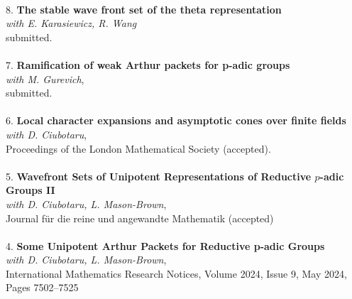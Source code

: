 \documentclass{article}
\begin{document}
\underline{\hspace{1.1in}} 
\\
8. \textbf{The stable wave front set of the theta representation} \\%
\textit{with E. Karasiewicz, R. Wang} \\
submitted. \\
\\
7. \textbf{Ramification of weak Arthur packets for p-adic groups} \\%
\textit{with M. Gurevich}, \\
submitted. \\
\\
6. \textbf{Local character expansions and asymptotic cones over finite fields} \\%
\textit{with D. Ciubotaru}, \\
Proceedings of the London Mathematical Society (accepted). \\
\\
5. \textbf{Wavefront Sets of Unipotent Representations of Reductive $p$-adic Groups II} \\%
\textit{with D. Ciubotaru, L. Mason-Brown}, \\
Journal für die reine und angewandte Mathematik (accepted) \\
\\
4. \textbf{Some Unipotent Arthur Packets for Reductive p-adic Groups} \\ %
\textit{with D. Ciubotaru, L. Mason-Brown}, \\
International Mathematics Research Notices, Volume 2024, Issue 9, May 2024, Pages 7502–7525 \\
\end{document}
